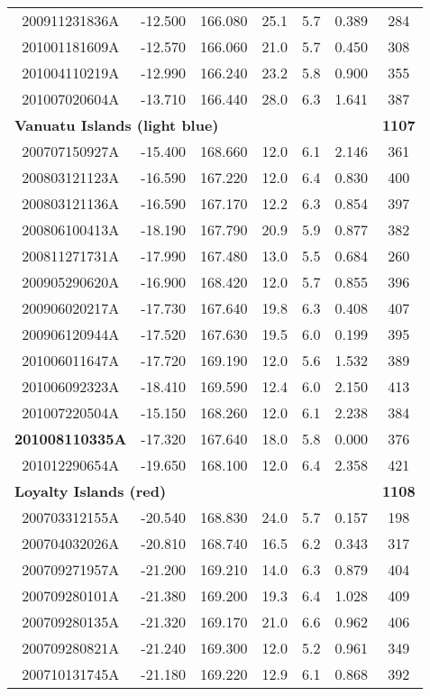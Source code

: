 \documentclass[12pt,oneside]{book}
\begin{document}
\begin{longtable}{ c c c c c c c }
200911231836A &-12.500 &166.080 &25.1 &5.7 &0.389 &284 \\
201001181609A &-12.570 &166.060 &21.0 &5.7 &0.450 &308 \\
201004110219A &-12.990 &166.240 &23.2 &5.8 &0.900 &355 \\
201007020604A &-13.710 &166.440 &28.0 &6.3 &1.641 &387 \\ \hline 
\multicolumn{3}{l}{\textbf{Vanuatu Islands (light blue)}} & & & &\textbf{1107} \\
200707150927A &-15.400 &168.660 &12.0 &6.1 &2.146 &361 \\
200803121123A &-16.590 &167.220 &12.0 &6.4 &0.830 &400 \\
200803121136A &-16.590 &167.170 &12.2 &6.3 &0.854 &397 \\
200806100413A &-18.190 &167.790 &20.9 &5.9 &0.877 &382 \\
200811271731A &-17.990 &167.480 &13.0 &5.5 &0.684 &260 \\
200905290620A &-16.900 &168.420 &12.0 &5.7 &0.855 &396 \\
200906020217A &-17.730 &167.640 &19.8 &6.3 &0.408 &407 \\
200906120944A &-17.520 &167.630 &19.5 &6.0 &0.199 &395 \\
201006011647A &-17.720 &169.190 &12.0 &5.6 &1.532 &389 \\
201006092323A &-18.410 &169.590 &12.4 &6.0 &2.150 &413 \\
201007220504A &-15.150 &168.260 &12.0 &6.1 &2.238 &384 \\
\textbf{201008110335A} &-17.320 &167.640 &18.0 &5.8 &0.000 &376 \\
201012290654A &-19.650 &168.100 &12.0 &6.4 &2.358 &421 \\ \hline 
\multicolumn{3}{l}{\textbf{Loyalty Islands (red)}} & & & &\textbf{1108} \\
200703312155A &-20.540 &168.830 &24.0 &5.7 &0.157 &198 \\
200704032026A &-20.810 &168.740 &16.5 &6.2 &0.343 &317 \\
200709271957A &-21.200 &169.210 &14.0 &6.3 &0.879 &404 \\
200709280101A &-21.380 &169.200 &19.3 &6.4 &1.028 &409 \\
200709280135A &-21.320 &169.170 &21.0 &6.6 &0.962 &406 \\
200709280821A &-21.240 &169.300 &12.0 &5.2 &0.961 &349 \\
200710131745A &-21.180 &169.220 &12.9 &6.1 &0.868 &392 \\

\end{longtable}
\end{document}
